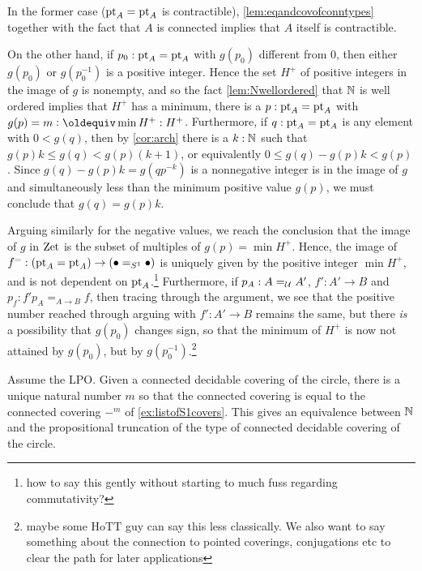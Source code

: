 In the former case (${\mathord{\mathrm{pt}}}_A={\mathord{\mathrm{pt}}}_A$ is contractible), \cref{lem:eqandcovofconntypes} together with the fact that $A$ is connected implies that $A$ itself is contractible.  

On the other hand, if $p_0:{\mathord{\mathrm{pt}}}_A={\mathord{\mathrm{pt}}}_A$ with $g(p_0)$ different from $0$, then either $g(p_0)$ or $g(p_0^{-1})$ is a positive integer.  Hence the set $H^+$ of positive integers in the image of $g$ is nonempty, and so the fact \cref{lem:Nwellordered} that $\mathbb{N}$ is well ordered implies that $H^+$ has a minimum, \ie there is a $p:{\mathord{\mathrm{pt}}}_A={\mathord{\mathrm{pt}}}_A$ with  $g(p)=m\defequi\min H^+:H^+$.  Furthermore, if $q:{\mathord{\mathrm{pt}}}_A={\mathord{\mathrm{pt}}}_A$ is any element with $0<g(q)$, then  by \cref{cor:arch} there is a $k:\mathbb{N}$ such that $g(p)k\leq g(q)<g(p)(k+1)$, or equivalently $0\leq g(q)-g(p)k< g(p)$.  Since $g(q)-g(p)k=g(qp^{-k})$ is a nonnegative integer is in the image of $g$ and simultaneously less than the minimum positive value $g(p)$, we must conclude that $g(q)=g(p)k$.

Arguing similarly for the negative values, we reach the conclusion that the image of $g$ in $\mathrm{Zet}$ is the subset of multiples of $g(p)=\min H^+$.  Hence, the image of $f^=:({\mathord{\mathrm{pt}}}_A={\mathord{\mathrm{pt}}}_A)\to(\bullet=_{S^1}\bullet)$ is uniquely given by the positive integer $\min H^+$, and is not dependent on ${\mathord{\mathrm{pt}}}_A$.\footnote{how to say this gently without starting to much fuss regarding commutativity?}  Furthermore, if $p_A:A=_{\mathcal{U}}A'$, $f':A'\to B$ and $p_f:f'p_A=_{A\to B}f$, then tracing through the argument, we see that the positive number reached through arguing with $f':A'\to B$ remains the same, but there \emph{is} a possibility that $g(p_0)$ changes sign, so that the minimum of $H^+$ is now not attained by $g(p_0)$, but by $g(p_0^{-1})$.\footnote{maybe some HoTT guy can say this less classically.  We also want to say something about the connection to pointed coverings, conjugations etc to clear the path for later applications}

\begin{lemma}
  \label{lem:componentsofcoversofS1}
  Assume the LPO. Given a connected decidable covering of the circle,  there is a unique natural number $m$ so that the connected covering is equal to the connected covering $-^m$ of \cref{ex:listofS1covers}.  This gives an equivalence between $\mathbb{N}$ and the propositional truncation of the type of connected decidable covering of the circle. 
\end{lemma}



